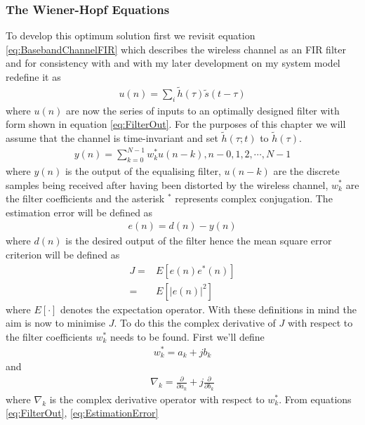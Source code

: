 \subsubsection{The Wiener-Hopf Equations}
To develop this optimum solution first we revisit equation %
\ref{eq:BasebandChannelFIR} which describes the wireless channel %
as an FIR filter and for consistency with \cite{Hay02} and %
with my later development on my system model redefine it as
\begin{align}
	u(n) = \sum_{i}\tilde{h}(\tau)\tilde{s}(t-\tau)
	\label{eq:ChannelOut}
\end{align}
where $u(n)$ are now the series of inputs to an optimally %
designed filter with form shown in equation \ref{eq:FilterOut}. %
For the purposes of this chapter %
we will assume that the channel is time-invariant and set %
$\tilde{h}(\tau;t)$ to $\tilde{h}(\tau)$.
\begin{align}
	y(n) = \sum_{k=0}^{N-1}w_{k}^{*}u(n-k), n - 0,1,2,\cdots,N-1
	\label{eq:FilterOut}
\end{align}
where $y(n)$ is the output of the equalising filter, %
$u(n-k)$ are the discrete samples being received %
after having been distorted by the wireless channel, %
$w_{k}^{*}$ are the %
filter coefficients and the asterisk $^*$ represents %
complex conjugation. The estimation error will be defined as 
\begin{align}
	e(n) = d(n) - y(n)
	\label{eq:EstimationError}
\end{align}
where $d(n)$ is the desired output of the filter %
hence the %
mean square error criterion will be defined as
\begin{align}
	J =& E\left[e(n)e^{*}(n)\right]
	\label{eq:MeanSquareError}\\
	=& E\left[\lvert e(n) \rvert^{2}\right]
\end{align}
where $E\left[\cdot\right]$ denotes the expectation %
operator. With these definitions in mind the aim is now %
to minimise $J$. To do this the complex derivative of $J$ with %
respect to the filter coefficients $w_{k}^{*}$ needs %
to be found. First we'll define
\begin{align}
	w_{k}^{*} = a_{k} + jb_{k}
\end{align}
and 
\begin{align}
	\nabla_{k} = \frac{\partial}{\partial a_{k}} + j 
	\frac{\partial}{\partial b_{k}}
\end{align}
where $\nabla_{k}$ is the complex derivative %
operator with respect to $w_{k}^{*}$. From %
equations \ref{eq:FilterOut}, \ref{eq:EstimationError} %
